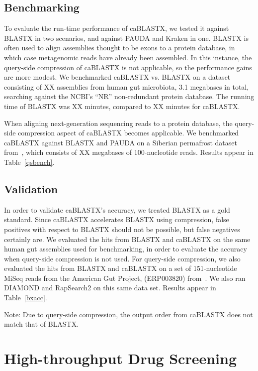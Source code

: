\documentclass{amsbook}
\theoremstyle{definition}
\theoremstyle{remark}
\numberwithin{equation}{section}
\begin{document}
\subsection*{Benchmarking}

To evaluate the run-time performance of caBLASTX, we tested it against
BLASTX in two scenarios, and against PAUDA and Kraken in one.
BLASTX is often used to align assemblies thought to be exons to a protein
database, in which case metagenomic reads have already been assembled.
In this instance, the query-side compression of caBLASTX is not applicable, so
the performance gains are more modest.
We benchmarked caBLASTX vs. BLASTX on a dataset consisting of XX assemblies
from human gut microbiota, 3.1 megabases in total, searching against the NCBI's
``NR'' non-redundant protein database.
The running time of BLASTX was XX minutes, compared to XX minutes for caBLASTX.

When aligning next-generation sequencing reads to a protein database, the
query-side compression aspect of caBLASTX becomes applicable.
We benchmarked caBLASTX against BLASTX and PAUDA on a Siberian
permafrost dataset from~\cite{blah}, which consists of XX megabases of
100-nucleotide reads.
Results appear in Table~\ref{qsbench}.



\subsection*{Validation}

In order to validate caBLASTX's accuracy, we treated BLASTX as a gold standard. 
Since caBLASTX accelerates BLASTX
using compression, false positives with respect to BLASTX should not be
possible, but false negatives certainly are.
We evaluated the hits from BLASTX and caBLASTX on the same human gut
assemblies used for benchmarking, in order to evaluate the accuracy when
query-side compression is not used.
For query-side compression, we also evaluated the hits from BLASTX and caBLASTX
on a set of 151-nucleotide MiSeq reads from the American Gut Project,
(ERP003820) from~\cite{blah}.
We also ran DIAMOND and RapSearch2 on this same data set.
Results appear in Table~\ref{bxacc}.

Note: Due to query-side compression, the output order from caBLASTX does not
match that of BLASTX.

\section*{High-throughput Drug Screening}
\end{document}
